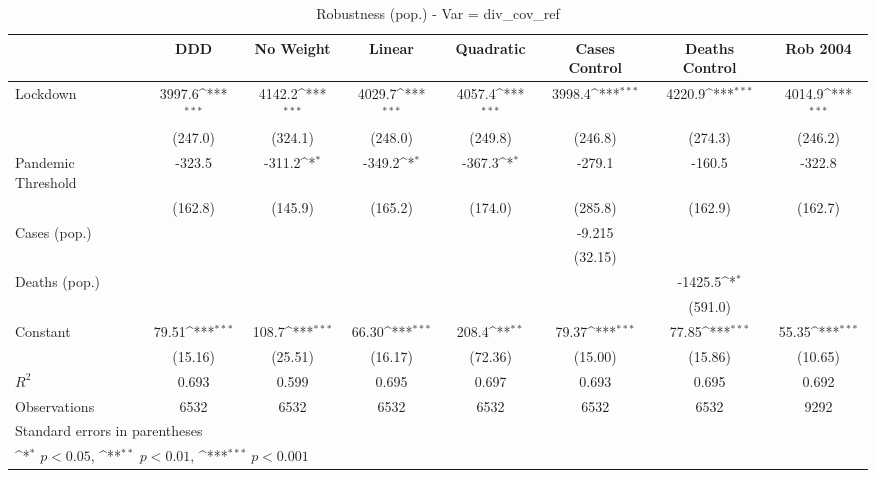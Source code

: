 \documentclass{article}
\begin{document}
{
\def\sym#1{\ifmmode^{#1}\else\(^{#1}\)\fi}
\begin{longtable}{l*{7}{c}}
\caption{Robustness (pop.) - Var = div\_cov\_ref}\\
\hline\hline\endfirsthead\hline\endhead\hline\endfoot\endlastfoot
                &\multicolumn{1}{c}{DDD}&\multicolumn{1}{c}{No Weight}&\multicolumn{1}{c}{Linear}&\multicolumn{1}{c}{Quadratic}&\multicolumn{1}{c}{Cases Control}&\multicolumn{1}{c}{Deaths Control}&\multicolumn{1}{c}{Rob 2004}\\
\hline
Lockdown        &   3997.6\sym{***}&   4142.2\sym{***}&   4029.7\sym{***}&   4057.4\sym{***}&   3998.4\sym{***}&   4220.9\sym{***}&   4014.9\sym{***}\\
                &  (247.0)         &  (324.1)         &  (248.0)         &  (249.8)         &  (246.8)         &  (274.3)         &  (246.2)         \\
Pandemic Threshold&   -323.5         &   -311.2\sym{*}  &   -349.2\sym{*}  &   -367.3\sym{*}  &   -279.1         &   -160.5         &   -322.8         \\
                &  (162.8)         &  (145.9)         &  (165.2)         &  (174.0)         &  (285.8)         &  (162.9)         &  (162.7)         \\
Cases (pop.)    &                  &                  &                  &                  &   -9.215         &                  &                  \\
                &                  &                  &                  &                  &  (32.15)         &                  &                  \\
Deaths (pop.)   &                  &                  &                  &                  &                  &  -1425.5\sym{*}  &                  \\
                &                  &                  &                  &                  &                  &  (591.0)         &                  \\
Constant        &    79.51\sym{***}&    108.7\sym{***}&    66.30\sym{***}&    208.4\sym{**} &    79.37\sym{***}&    77.85\sym{***}&    55.35\sym{***}\\
                &  (15.16)         &  (25.51)         &  (16.17)         &  (72.36)         &  (15.00)         &  (15.86)         &  (10.65)         \\
\hline
\(R^{2}\)       &    0.693         &    0.599         &    0.695         &    0.697         &    0.693         &    0.695         &    0.692         \\
Observations    &     6532         &     6532         &     6532         &     6532         &     6532         &     6532         &     9292         \\
\hline\hline
\multicolumn{8}{l}{\footnotesize Standard errors in parentheses}\\
\multicolumn{8}{l}{\footnotesize \sym{*} \(p<0.05\), \sym{**} \(p<0.01\), \sym{***} \(p<0.001\)}\\
\end{longtable}
}
\end{document}
